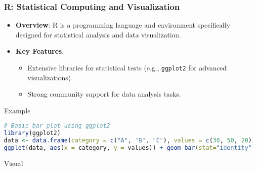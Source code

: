 \documentclass[aspectratio=169]{beamer}
\begin{document}
\begin{frame}[fragile]
    \frametitle{R: Statistical Computing and Visualization}
    \begin{itemize}
        \item \textbf{Overview}: R is a programming language and environment specifically designed for statistical analysis and data visualization.
        \item \textbf{Key Features}:
        \begin{itemize}
            \item Extensive libraries for statistical tests (e.g., \texttt{ggplot2} for advanced visualizations).
            \item Strong community support for data analysis tasks.
        \end{itemize}
    \end{itemize}
    \begin{block}{Example}
        \begin{lstlisting}[language=R]
# Basic bar plot using ggplot2
library(ggplot2)
data <- data.frame(category = c("A", "B", "C"), values = c(30, 50, 20))
ggplot(data, aes(x = category, y = values)) + geom_bar(stat="identity")
        \end{lstlisting}
    \end{block}
    \begin{block}{Visual}
    \end{block}
\end{frame}
\end{document}
